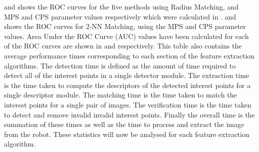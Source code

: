 \documentclass{report}
\begin{document}
 and  shows the ROC curves for the five methods using Radius Matching, and MPS and CPS parameter values respectively which were calculated in .  and  shows the ROC curves for 2-NN Matching, using the MPS and CPS parameter values. Area Under the ROC Curve (AUC) values have been calculated for each of the ROC curves are shown in  and  respectively. This table also contains the average performance times corresponding to each section of the feature extraction algorithms. The detection time is defined as the amount of time required to detect all of the interest points in a single detector module. The extraction time is the time taken to compute the descriptors of the detected interest points for a single descriptor module. The matching time is the time taken to match the interest points for a single pair of images. The verification time is the time taken to detect and remove invalid invalid interest points. Finally the overall time is the summation of these times as well as the time to process and extract the image from the robot. These statistics will now be analysed for each feature extraction algorithm. \\
\end{document}
